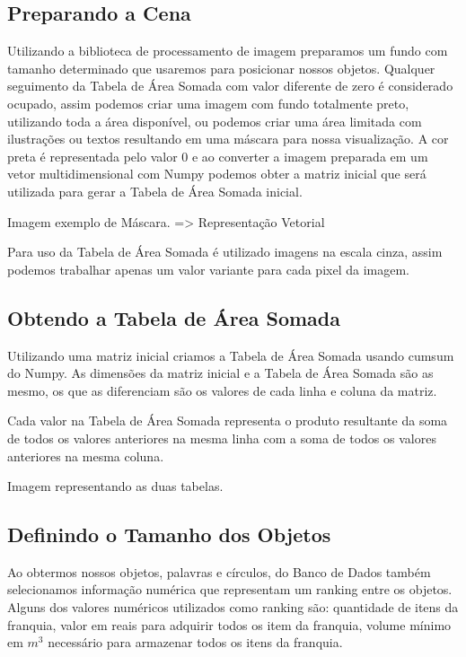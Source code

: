 \documentclass[12pt]{article}
\begin{document}
\subsection{Preparando a Cena}

Utilizando a biblioteca de processamento de imagem preparamos um fundo com tamanho determinado que usaremos para posicionar nossos objetos. 
Qualquer seguimento da Tabela de Área Somada com valor diferente de zero é considerado ocupado, assim podemos criar uma imagem com fundo totalmente preto, utilizando toda a área disponível, ou podemos criar uma área limitada com ilustrações ou textos resultando em uma máscara para nossa visualização.
A cor preta é representada pelo valor 0 e ao converter a imagem preparada em um vetor multidimensional com Numpy podemos obter a matriz inicial que será utilizada para gerar a Tabela de Área Somada inicial.


Imagem exemplo de Máscara. => Representação Vetorial


Para uso da Tabela de Área Somada é utilizado imagens na escala cinza, assim podemos trabalhar apenas um valor variante para cada pixel da imagem.


\subsection{Obtendo a Tabela de Área Somada}

Utilizando uma matriz inicial criamos a Tabela de Área Somada usando cumsum do Numpy. As dimensões da matriz inicial e a Tabela de Área Somada são as mesmo, os que as diferenciam são os valores de cada linha e coluna da matriz. 

Cada valor na Tabela de Área Somada representa o produto resultante da soma de todos os valores anteriores na mesma linha com a soma de todos os valores anteriores na mesma coluna.

Imagem representando as duas tabelas.


\subsection{Definindo o Tamanho dos Objetos}

Ao obtermos nossos objetos, palavras e círculos, do Banco de Dados também selecionamos informação numérica que representam um ranking entre os objetos. Alguns dos valores numéricos utilizados como ranking são: quantidade de itens da franquia, valor em reais para adquirir todos os item da franquia, volume mínimo em $m^3$ necessário para armazenar todos os itens da franquia.
\end{document}
